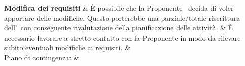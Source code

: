 \documentclass[PianoDiProgetto.tex]{subfiles}
\begin{document}
\begin{longtabu}
	
	 \textbf{Modifica dei requisiti} 
	&
	{\small È possibile che la Proponente \Proponente\ decida di voler apportare delle modifiche. Questo porterebbe una parziale/totale riscrittura dell'\adr\ con conseguente rivalutazione della pianificazione delle attività.}
	&
	{\small È necessario lavorare a stretto contatto con la Proponente in modo da rilevare subito eventuali modifiche ai requisiti.}
	&
	  \\
	 Piano di contingenza:
	&
	\\
	\hhline{====}
		
\end{longtabu}
\end{document}
